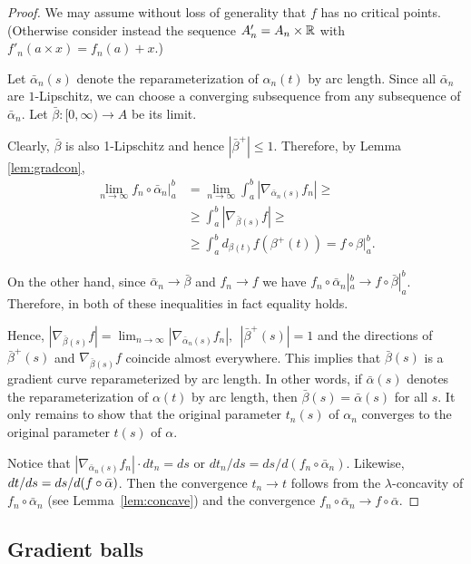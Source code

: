 \documentclass{amsart}
\begin{document}
\begin{proof}
We may assume without loss of generality  that $f$ has no critical points.
(Otherwise consider instead the  sequence $A'_n=A_n\times{\Bbb R}$ with $f'_n(a\times x)=f_n(a)+x$.)

Let $\bar\alpha_n(s)$ denote the reparameterization of $\alpha_n(t)$
by arc length.
Since all $\bar\alpha_n$ are $1$-Lipschitz,
 we can choose a converging subsequence from
any subsequence of $\bar\alpha_n$.
Let $\bar\beta\colon [0,\infty)\to A$ be its limit.

Clearly, $\bar\beta$ is also 1-Lipschitz and hence $|\bar\beta^+|\le 1$.
Therefore, by Lemma \ref{lem:gradcon},
\begin{align*}
\lim_{n\to\infty}f_n\circ\bar\alpha_n|_a^b
&=
\lim_{n\to\infty}\int_a^b|\nabla_{\bar\alpha_n(s)} f_n|\ge
\\
&\ge\int_a^b|\nabla_{\bar\beta(s)} f|\ge
\\
&\ge
\int_a^b d_{\beta(t)} f(\beta^+(t))=f\circ\beta|_a^b.
\end{align*}

On the other hand, since $\bar\alpha_n\to\bar\beta$ and $f_n\to f$ we have
$f_n\circ\bar\alpha_n|_a^b \to f\circ\bar\beta|_a^b$.
Therefore, in both of these inequalities in fact equality holds.

Hence, $|\nabla_{\bar\beta(s)} f|= \lim_{n\to\infty} |\nabla_{\bar\alpha_n(s)} f_n|,\ \
|\bar\beta^+(s)|= 1$
and the directions of $\bar\beta^+(s)$ and  $\nabla_{\bar\beta(s)} f$
coincide almost everywhere.
This implies that $\bar\beta(s)$ is a gradient curve reparameterized by
arc length.
In other words, if $\bar\alpha(s)$ denotes the
reparameterization of $\alpha(t)$
by arc length,
then $\bar\beta(s)=\bar\alpha(s)$ for all $s$.
It only remains to show that the original
parameter $t_n(s)$ of $\alpha_n$ converges to the original
parameter $t(s)$ of $\alpha$.

Notice that $|\nabla_{\bar\alpha_n(s)} f_n|\cdot dt_n=ds$ or
$dt_n/ds=ds/d(f_n\circ\bar\alpha_n)$.
Likewise, $dt/ds\z=ds/d(f\circ\bar\alpha)$.
Then the convergence $t_n\to t$ follows from the $\lambda$-concavity of
$f_n\circ\bar\alpha_n$ (see Lemma~\ref{lem:concave})
and the convergence $f_n\circ\bar\alpha_n\to f\circ\bar\alpha.$
\end{proof}

\subsection{Gradient balls}
\end{document}
